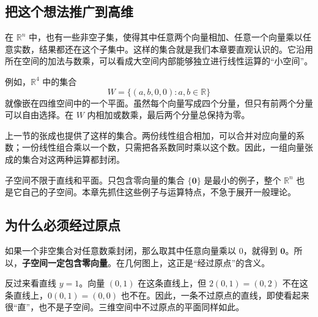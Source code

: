 \documentclass[a4paper,12pt,twoside,openany,fontset=none]{ctexbook}
\numberwithin{equation}{chapter}
\begin{document}
\subsection*{把这个想法推广到高维}

在 $\mathbb{R}^n$ 中，也有一些非空子集，使得其中任意两个向量相加、任意一个向量乘以任意实数，结果都还在这个子集中。这样的集合就是我们本章要直观认识的\textbf{}。它沿用所在空间的加法与数乘，可以看成大空间内部能够独立进行线性运算的“小空间”。

例如，$\mathbb{R}^4$ 中的集合
\[
    W=\{(a,b,0,0):a,b\in\mathbb{R}\}
\]
就像嵌在四维空间中的一个平面。虽然每个向量写成四个分量，但只有前两个分量可以自由选择。在 $W$ 内相加或数乘，最后两个分量总保持为零。

上一节的张成也提供了这样的集合。两份线性组合相加，可以合并对应向量的系数；一份线性组合乘以一个数，只需把各系数同时乘以这个数。因此，一组向量张成的集合对这两种运算都封闭。

子空间不限于直线和平面。只包含零向量的集合 $\{\boldsymbol{0}\}$ 是最小的例子，整个 $\mathbb{R}^n$ 也是它自己的子空间。本章先抓住这些例子与运算特点，不急于展开一般理论。

\subsection*{为什么必须经过原点}

如果一个非空集合对任意数乘封闭，那么取其中任意向量乘以 $0$，就得到 $\boldsymbol{0}$。所以，\textbf{子空间一定包含零向量}。在几何图上，这正是“经过原点”的含义。

反过来看直线 $y=1$。向量 $(0,1)$ 在这条直线上，但 $2(0,1)=(0,2)$ 不在这条直线上，$0(0,1)=(0,0)$ 也不在。因此，一条不过原点的直线，即使看起来很“直”，也不是子空间。三维空间中不过原点的平面同样如此。

\end{document}
